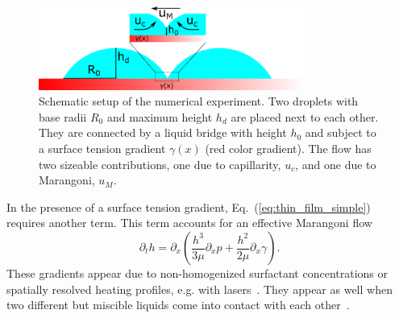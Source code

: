 \begin{figure}
    \centering
    \includegraphics[width=0.78\textwidth]{graphics/setup.png}
    \caption{Schematic setup of the numerical experiment. 
    Two droplets with base radii $R_0$ and maximum height $h_d$ are placed next to each other. 
    They are connected by a liquid bridge with height $h_0$ and subject to a surface tension gradient $\gamma(x)$ (red color gradient).
    The flow has two sizeable contributions, one due to capillarity, $u_c$, and one due to Marangoni, $u_M$.
    }
    \label{fig:schematics}
\end{figure}
In the presence of a surface tension gradient, Eq.~(\ref{eq:thin_film_simple}) requires another term.
This term accounts for an effective Marangoni flow~\cite{doi:10.1021/la500459v, karpitschka2014sharp, bestehorn20033d, doi:10.1021/la960488a}
\begin{equation}\label{eq:thin_with_marangoni}
    \partial_t h = \partial_x \left(\frac{h^3}{3\mu}\partial_x p + \frac{h^2}{2\mu}\partial_x\gamma\right).
\end{equation}
These gradients appear due to non-homogenized surfactant concentrations or spatially resolved heating profiles, e.g. with lasers~\cite{doi:10.1021/la960488a, NIKOLOV2002325, bruning2018delayed, wedershoven2014infrared}. 
They appear as well when two different but miscible liquids come into contact with each other~\cite{doi:10.1021/la800630w, karpitschka2014sharp, doi:10.1021/la500459v}. 

